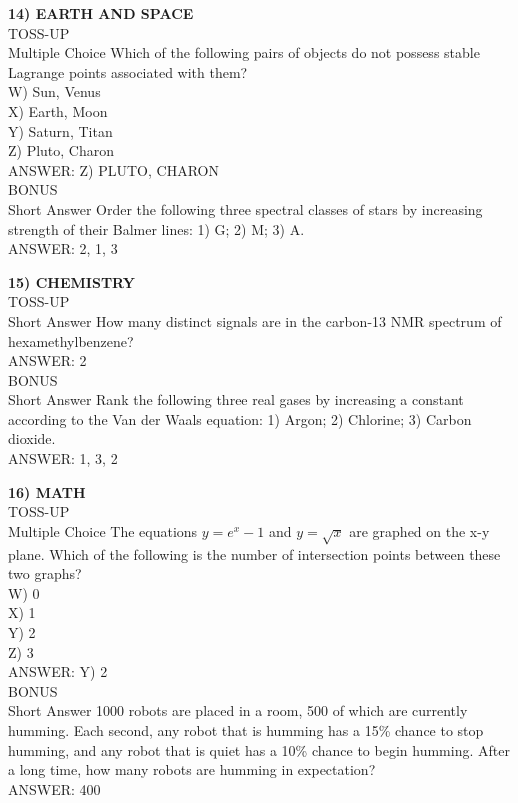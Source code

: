 \documentclass{article}
\begin{document}
\noindent \textbf{14) EARTH AND SPACE} \\
TOSS-UP \\
Multiple Choice Which of the following pairs of objects do not possess stable Lagrange points associated with them? \\
W) Sun, Venus \\
X) Earth, Moon \\
Y) Saturn, Titan \\
Z) Pluto, Charon \\
ANSWER: Z) PLUTO, CHARON \\
BONUS \\
Short Answer Order the following three spectral classes of stars by increasing strength of their Balmer lines: 1) G; 2) M; 3) A. \\
ANSWER: 2, 1, 3

\noindent \textbf{15) CHEMISTRY} \\
TOSS-UP \\
Short Answer How many distinct signals are in the carbon-13 NMR spectrum of hexamethylbenzene? \\
ANSWER: 2 \\
BONUS \\
Short Answer Rank the following three real gases by increasing a constant according to the Van der Waals equation: 1) Argon; 2) Chlorine; 3) Carbon dioxide. \\
ANSWER: 1, 3, 2

\noindent \textbf{16) MATH} \\
TOSS-UP \\
Multiple Choice The equations $y=e^{x}-1$ and $y=\sqrt{x}$ are graphed on the x-y plane. Which of the following is the number of intersection points between these two graphs? \\
W) 0 \\
X) 1 \\
Y) 2 \\
Z) 3 \\
ANSWER: Y) 2 \\
BONUS \\
Short Answer 1000 robots are placed in a room, 500 of which are currently humming. Each second, any robot that is humming has a 15\% chance to stop humming, and any robot that is quiet has a 10\% chance to begin humming. After a long time, how many robots are humming in expectation? \\
ANSWER: 400
\end{document}

